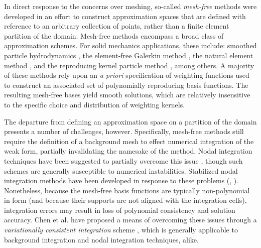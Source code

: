 		In direct response to the concerns over meshing, so-called \textit{mesh-free} methods were developed in an effort to construct approximation spaces that are defined with reference to an arbitrary collection of points, rather than a finite element partition of the domain. Mesh-free methods encompass a broad class of approximation schemes. For solid mechanics applications, these include: smoothed particle hydrodynamics \cite{Libersky:91}, the element-free Galerkin method \cite{Belytschko:94}, the natural element method \cite{Sukumar:98}, and the reproducing kernel particle method \cite{Liu:95}, among others. A majority of these methods rely upon an \textit{a priori} specification of weighting functions used to construct an associated set of polynomially reproducing basis functions. The resulting mesh-free bases yield smooth solutions, which are relatively insensitive to the specific choice and distribution of weighting kernels.
		
		
		The departure from defining an approximation space on a partition of the domain presents a number of challenges, however. Specifically, mesh-free methods still require the definition of a background mesh to effect numerical integration of the weak form, partially invalidating the namesake of the method. Nodal integration techniques have been suggested to partially overcome this issue \cite{Beissel:96}, though such schemes are generally susceptible to numerical instabilities. Stabilized nodal integration methods have been developed in response to these problems (\cite{Chen:01}, \cite{Chen:07}). Nonetheless, because the mesh-free basis functions are typically non-polynomial in form (and because their supports are not aligned with the integration cells), integration errors may result in loss of polynomial consistency and solution accuracy. Chen et al. have proposed a means of overcoming these issues through a \textit{variationally consistent integration} scheme \cite{Chen:13}, which is generally applicable to background integration and nodal integration techniques, alike.


